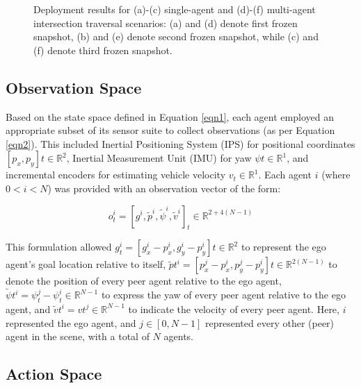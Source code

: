 \documentclass[letterpaper, 10 pt, conference]{ieeeconf}  %
\begin{document}
\begin{figure}[t]
\begin{subfigure}[b]{0.16\linewidth}
         \caption{}
         \label{fig6f}
     \end{subfigure}
     \caption{Deployment results for (a)-(c) single-agent and (d)-(f) multi-agent intersection traversal scenarios: (a) and (d) denote first frozen snapshot, (b) and (e) denote second frozen snapshot, while (c) and (f) denote third frozen snapshot.}
    \label{fig6}
\end{figure}

\subsection{Observation Space}
\label{Sub-Section: Observation Space I}

Based on the state space defined in Equation \ref{eqn1}, each agent employed an appropriate subset of its sensor suite to collect observations (as per Equation \ref{eqn2}). This included Inertial Positioning System (IPS) for positional coordinates $\left [ p_{x}, p_{y} \right ]{t} \in \mathbb{R}^{2}$, Inertial Measurement Unit (IMU) for yaw $\psi{t} \in \mathbb{R}^{1}$, and incremental encoders for estimating vehicle velocity $v_{t} \in \mathbb{R}^{1}$. Each agent $i$ (where $0<i<N$) was provided with an observation vector of the form:

\begin{equation}
\label{eqn2}
o_{t}^{i} = \left [ g^{i}, \tilde{p}^{i}, \tilde{\psi}^{i}, \tilde{v}^{i} \right ]_{t} \in \mathbb{R}^{2+4(N-1)}
\end{equation}

This formulation allowed $g_{t}^{i} = \left [ g_{x}^{i}-p_{x}^{i}, g_{y}^{i}-p_{y}^{i} \right ]{t} \in \mathbb{R}^{2}$ to represent the ego agent's goal location relative to itself, $\tilde{p}{t}^{i} = \left [ p_{x}^{j}-p_{x}^{i}, p_{y}^{j}-p_{y}^{i} \right ]{t} \in \mathbb{R}^{2(N-1)}$ to denote the position of every peer agent relative to the ego agent, $\tilde{\psi}{t}^{i} = \psi_{t}^{j}-\psi_{t}^{i} \in \mathbb{R}^{N-1}$ to express the yaw of every peer agent relative to the ego agent, and $\tilde{v}{t}^{i} = v{t}^{j} \in \mathbb{R}^{N-1}$ to indicate the velocity of every peer agent. Here, $i$ represented the ego agent, and $j \in \left [ 0, N-1 \right ]$ represented every other (peer) agent in the scene, with a total of $N$ agents. 

\subsection{Action Space}
\label{Sub-Section: Action Space I}
\end{document}
